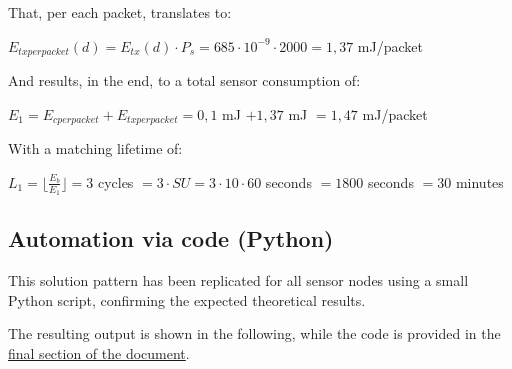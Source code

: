 \documentclass[a4paper,11pt]{article} %
\begin{document}
    \smallskip

    That, per each packet, translates to:

    \smallskip

    $E_{tx per packet}(d) = E_{tx}(d) \cdot P_s = 685 \cdot 10^{-9} \cdot 2000 = 1,37$ mJ/packet

    \smallskip

    And results, in the end, to a total sensor consumption of:

    \smallskip

    $E_1 = E_{c per packet} + E_{tx per packet} = 0,1$ mJ $+ 1,37$ mJ $= 1,47$ mJ/packet

    \bigskip

    With a matching lifetime of:

    \smallskip

    $L_1 = \lfloor \frac{E_b}{E_1} \rfloor = 3$ cycles $= 3 \cdot SU = 3 \cdot 10 \cdot 60$ seconds $= 1800$ seconds $= 30$ minutes

    \subsection{Automation via code (Python)}\label{subsec:automation-via-code-(python)}

    This solution pattern has been replicated for all sensor nodes using a small Python script, confirming the expected theoretical results.

    The resulting output is shown in the following, while the code is provided in the \hyperref[subsec:lifetime-of-the-system-with-a-fixed-sink-position]{final section of the document}.
\end{document}
